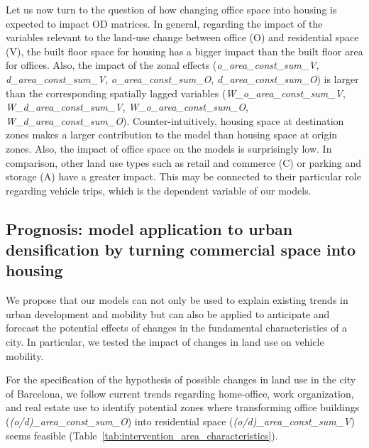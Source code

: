 Let us now turn to the question of how changing office space into housing is expected to impact OD matrices.
In general, regarding the impact of the variables relevant to the land-use change between office (O) and residential space (V), the built floor space for housing has a bigger impact than the built floor area for offices. Also, the impact of the zonal effects (\emph{o\_area\_const\_sum\_V}, \emph{d\_area\_const\_sum\_V}, \emph{o\_area\_const\_sum\_O}, \emph{d\_area\_const\_sum\_O}) is larger than the corresponding spatially lagged variables (\emph{W\_o\_area\_const\_sum\_V}, \emph{W\_d\_area\_const\_sum\_V}, \emph{W\_o\_area\_const\_sum\_O}, \emph{W\_d\_area\_const\_sum\_O}). Counter-intuitively, housing space at destination zones makes a larger contribution to the model than housing space at origin zones. Also, the impact of office space on the models is surprisingly low. In comparison, other land use types such as retail and commerce (C) or parking and storage (A) have a greater impact. This may be connected to their particular role regarding vehicle trips, which is the dependent variable of our models.

\subsection{Prognosis: model application to urban densification by turning commercial space into housing}

We propose that our models can not only be used to explain existing trends in urban development and mobility but can also be applied to anticipate and forecast the potential effects of changes in the fundamental characteristics of a city. In particular, we tested the impact of changes in land use on vehicle mobility. 

For the specification of the hypothesis of possible changes in land use in the city of Barcelona, we follow current trends regarding home-office, work organization, and real estate use to identify potential zones where transforming office buildings (\textit{(o/d)\_area\_const\_sum\_O}) into residential space (\textit{(o/d)\_area\_const\_sum\_V}) seems feasible \citep{2023The2023} (Table~\ref{tab:intervention_area_characteristics}).



